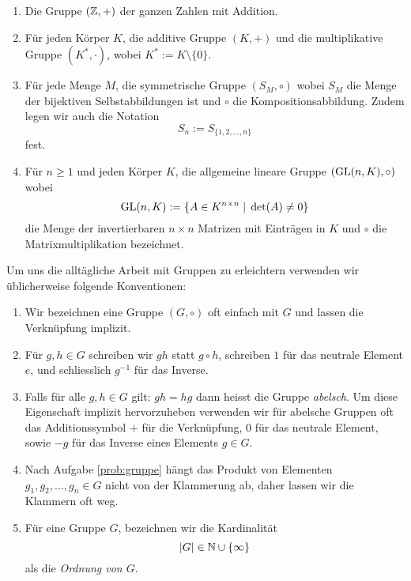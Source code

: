 \documentclass{book}
\begin{document}
\begin{exas} 
    \begin{enumerate}
        \item Die Gruppe $(\mathbb{Z},+)$ der ganzen Zahlen mit Addition.
        \item Für jeden Körper $K$, die additive Gruppe $(K,+)$ und die multiplikative Gruppe $(K^*, \cdot)$, wobei $K^* := K \setminus \{0\}$. 
        \item Für jede Menge $M$, die symmetrische Gruppe $(S_M, \circ)$ wobei $S_M$ die
            Menge der bijektiven Selbstabbildungen ist und $\circ$ die
            Kompositionsabbildung. Zudem legen wir auch die Notation
            \[
                S_n := S_{\{1,2,...,n\}}
            \]
            fest. 
        \item Für $n \ge 1$ und jeden Körper $K$, die allgemeine lineare Gruppe $(\operatorname{GL}(n,K), \circ)$ wobei
            \[
                \operatorname{GL}(n,K) := \{ A \in K^{n \times n} \; | \; \det(A) \neq 0 \}
            \]
            die Menge der invertierbaren $n \times n$ Matrizen mit Einträgen in
            $K$ und $\circ$ die Matrixmultiplikation bezeichnet. 
    \end{enumerate}
\end{exas}

Um uns die alltägliche Arbeit mit Gruppen zu erleichtern verwenden wir üblicherweise folgende Konventionen:
\begin{enumerate}
    \item Wir bezeichnen eine Gruppe $(G, \circ)$ oft einfach mit $G$ und lassen die Verknüpfung implizit. 
    \item Für $g,h \in G$ schreiben wir $gh$ statt $g \circ h$, schreiben $1$
        für das neutrale Element $e$, und schliesslich $g^{-1}$ für das
        Inverse. 
    \item Falls für alle $g,h \in G$ gilt: $gh = hg$ dann heisst die Gruppe
        {\em abelsch}. Um diese Eigenschaft implizit hervorzuheben verwenden
        wir für abelsche Gruppen oft das Additionssymbol $+$ für die
        Verknüpfung, $0$ für das neutrale Element, sowie $-g$ für das Inverse
        eines Elements $g \in G$. 
    \item Nach Aufgabe \ref{prob:gruppe} hängt das Produkt von Elementen $g_1,
        g_2, ..., g_n \in G$ nicht von der Klammerung ab, daher lassen wir die
        Klammern oft weg.
    \item Für eine Gruppe $G$, bezeichnen wir die Kardinalität 
        \[
            |G| \in \mathbb{N} \cup \{\infty\}
        \]
        als die {\em Ordnung von $G$}.
\end{enumerate}
\end{document}

